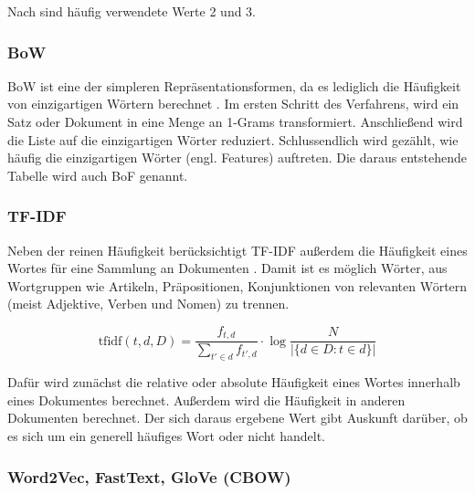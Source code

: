 Nach \textcite[5]{kowsari_text_2019} sind häufig verwendete Werte \num{2} und \num{3}.

\subsubsection*{\acl{BoW}} 

\ac{BoW} ist eine der simpleren Repräsentationsformen, da es lediglich die Häufigkeit von einzigartigen Wörtern berechnet \autocite[6]{kowsari_text_2019}. Im ersten Schritt des Verfahrens, wird ein Satz oder Dokument in eine Menge an 1-Grams transformiert. Anschließend wird die Liste auf die einzigartigen Wörter reduziert. Schlussendlich wird gezählt, wie häufig die einzigartigen Wörter (engl. Features) auftreten. Die daraus entstehende Tabelle wird auch \ac{BoF} genannt.


\subsubsection*{\acl{TF-IDF}}

Neben der reinen Häufigkeit berücksichtigt \ac{TF-IDF} außerdem die Häufigkeit eines Wortes für eine Sammlung an Dokumenten \autocite[7]{kowsari_text_2019}. Damit ist es möglich Wörter, aus Wortgruppen wie Artikeln, Präpositionen, Konjunktionen von relevanten Wörtern (meist Adjektive, Verben und Nomen) zu trennen.

\[\mathrm{tfidf}(t,d,D) = \frac{f_{t,d}}{{\sum_{t' \in d}{f_{t',d}}}} \cdot \log \frac{N}{|\{d \in D: t \in d\}|}\]

Dafür wird zunächst die relative oder absolute Häufigkeit eines Wortes innerhalb eines Dokumentes berechnet. Außerdem wird die Häufigkeit in anderen Dokumenten berechnet. Der sich daraus ergebene Wert gibt Auskunft darüber, ob es sich um ein generell häufiges Wort oder nicht handelt.

\subsubsection*{Word2Vec, FastText, GloVe (CBOW)}


